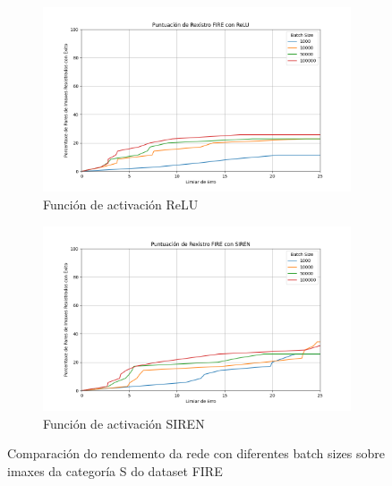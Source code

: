 \begin{figure}[ht]
    \centering
    \begin{subfigure}[b]{0.5\textwidth}
        \centering
        \includegraphics[width=\textwidth]{imaxes/batchsize/fire_registration_scores_bs_relu_S.png}
        \caption{Función de activación ReLU}
        \label{fig:batch_size_comparison_relu}
    \end{subfigure}\hfill
    \begin{subfigure}[b]{0.5\textwidth}
        \centering
        \includegraphics[width=\textwidth]{imaxes/batchsize/fire_registration_scores_bs_siren_S.png}
        \caption{Función de activación SIREN}
        \label{fig:batch_size_comparison_siren}
    \end{subfigure}
    \caption{Comparación do rendemento da rede con diferentes batch sizes sobre imaxes da categoría S do dataset FIRE}
    \label{fig:batch_size_comparisons_fire}
\end{figure}



